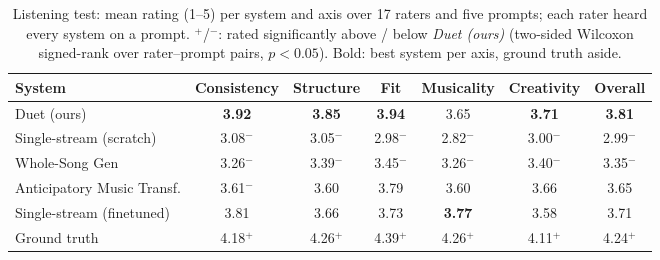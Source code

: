 \begin{table}[t]
\caption{Listening test: mean rating (1--5) per system and axis over 17 raters and five prompts; each rater heard every system on a prompt. $^{\mathrm{+}}$/$^{\mathrm{-}}$: rated significantly above / below \emph{Duet (ours)} (two-sided Wilcoxon signed-rank over rater--prompt pairs, $p<0.05$). Bold: best system per axis, ground truth aside.}
\label{tab:listening}
\begin{center}
\footnotesize
\setlength{\tabcolsep}{4pt}
\begin{tabular}{|l|c|c|c|c|c|c|}
\hline
\textbf{System} & \textbf{Consistency} & \textbf{Structure} & \textbf{Fit} & \textbf{Musicality} & \textbf{Creativity} & \textbf{Overall} \\
\hline
Duet (ours) & \textbf{3.92} & \textbf{3.85} & \textbf{3.94} & 3.65 & \textbf{3.71} & \textbf{3.81} \\
Single-stream (scratch) & 3.08$^{\mathrm{-}}$ & 3.05$^{\mathrm{-}}$ & 2.98$^{\mathrm{-}}$ & 2.82$^{\mathrm{-}}$ & 3.00$^{\mathrm{-}}$ & 2.99$^{\mathrm{-}}$ \\
Whole-Song Gen & 3.26$^{\mathrm{-}}$ & 3.39$^{\mathrm{-}}$ & 3.45$^{\mathrm{-}}$ & 3.26$^{\mathrm{-}}$ & 3.40$^{\mathrm{-}}$ & 3.35$^{\mathrm{-}}$ \\
Anticipatory Music Transf. & 3.61$^{\mathrm{-}}$ & 3.60 & 3.79 & 3.60 & 3.66 & 3.65 \\
Single-stream (finetuned) & 3.81 & 3.66 & 3.73 & \textbf{3.77} & 3.58 & 3.71 \\
Ground truth & 4.18$^{\mathrm{+}}$ & 4.26$^{\mathrm{+}}$ & 4.39$^{\mathrm{+}}$ & 4.26$^{\mathrm{+}}$ & 4.11$^{\mathrm{+}}$ & 4.24$^{\mathrm{+}}$ \\
\hline
\end{tabular}
\end{center}
\end{table}
